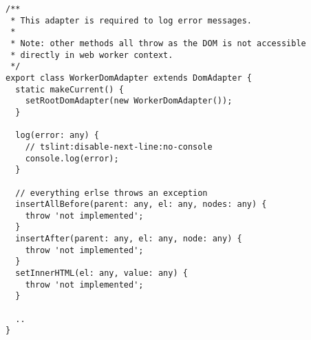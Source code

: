 \begin{verbatim}
/**
 * This adapter is required to log error messages.
 *
 * Note: other methods all throw as the DOM is not accessible
 * directly in web worker context.
 */
export class WorkerDomAdapter extends DomAdapter {
  static makeCurrent() {
    setRootDomAdapter(new WorkerDomAdapter());
  }

  log(error: any) {
    // tslint:disable-next-line:no-console
    console.log(error);
  }

  // everything erlse throws an exception
  insertAllBefore(parent: any, el: any, nodes: any) {
    throw 'not implemented';
  }
  insertAfter(parent: any, el: any, node: any) {
    throw 'not implemented';
  }
  setInnerHTML(el: any, value: any) {
    throw 'not implemented';
  }

  ..
}
\end{verbatim}
